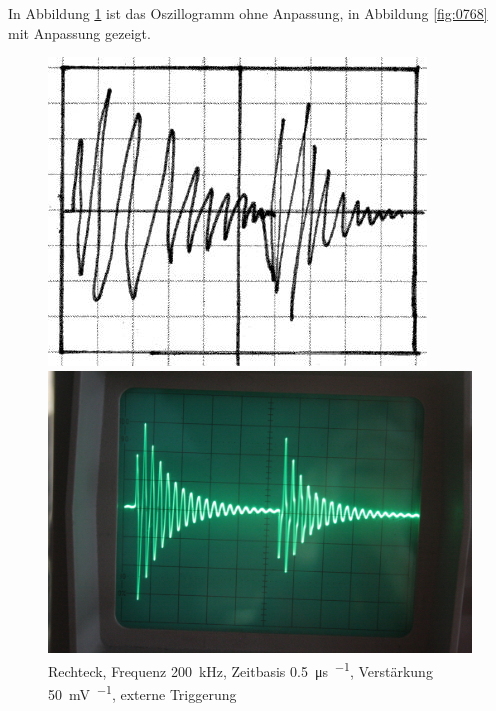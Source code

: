 In Abbildung \ref{fig:0767} ist das Oszillogramm ohne Anpassung, in Abbildung
\ref{fig:0768} mit Anpassung gezeigt.

\begin{figure}
	\centering
	\begin{minipage}{.45\linewidth}
	\includegraphics[width=\linewidth]{Skizzen/IMG_0767-1500.jpg}
	\end{minipage}
	\hfill
	\begin{minipage}{.45\linewidth}
	\includegraphics[width=\linewidth]{Fotos/IMG_0767-1500.jpg}
	\end{minipage}
	\caption{%
		Rechteck, Frequenz \SI{200}{\kilo\hertz},
		Zeitbasis \SI{.5}{\micro\second\per\division},
		Verstärkung \SI{50}{\milli\volt\per\division},
		externe Triggerung
	}
	\label{fig:0767}
\end{figure}

